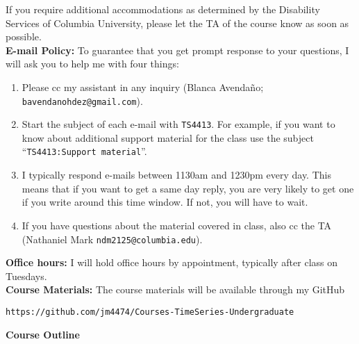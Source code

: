 \documentclass[12pt]{article} %
\numberwithin{equation}{section}
\theoremstyle{definition}
\newcommand{\0}{\textbf{0}}                          %
\begin{document}
\noindent If you require additional accommodations as determined by the Disability Services of Columbia University, please let the TA of the course know as soon as possible.\\

\noindent \textbf{E-mail Policy:} To guarantee that you get prompt response to your questions, I will ask you to help me with four things: 
\begin{enumerate}
\item Please cc my assistant in any inquiry (Blanca Avenda\~no; \texttt{bavendanohdez@gmail.com}). 
\item Start the subject of each e-mail with \texttt{TS4413}. For example, if you want to know about additional support material for the class use the subject ``\texttt{TS4413:Support material}\textquotedblright.
\item I typically respond e-mails between 1130am and 1230pm every day.  This means that if you want to get a same day reply, you are very likely to get one if you write around this time window. If not, you will have to wait.   

\item If you have questions about the material covered in class, also cc the TA (Nathaniel Mark \texttt{ndm2125@columbia.edu}).
\end{enumerate}
   

\noindent \textbf{Office hours:} I will hold office hours by appointment, typically after class on Tuesdays.   \\

\noindent \textbf{Course Materials:} The course materials will be available through my GitHub

\begin{center}
\texttt{https://github.com/jm4474/Courses-TimeSeries-Undergraduate}
\end{center}


\newpage


\textbf{Course Outline}\\
\end{document}
